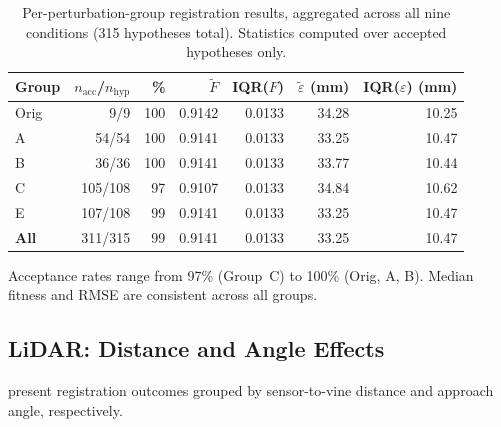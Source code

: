 \begin{table}[htbp]
  \centering
  \small
  \setlength{\tabcolsep}{4pt}
  \caption{Per-perturbation-group registration results, aggregated across all nine conditions (315 hypotheses total). Statistics computed over accepted hypotheses only.}
  \label{tab:pa-results-groups}
  \begin{tabular}{@{} l r r r r r r @{}}
    \toprule
    \textbf{Group} &
    \boldmath$n_\text{acc}$\textbf{/}\boldmath$n_\text{hyp}$ &
    \textbf{\%} &
    \boldmath$\tilde{F}$ &
    \textbf{IQR(}\boldmath$F$\textbf{)} &
    \boldmath$\tilde{\varepsilon}$ \textbf{(mm)} &
    \textbf{IQR(}\boldmath$\varepsilon$\textbf{) (mm)} \\
    \midrule
    Orig   &   9/9   & 100 & 0.9142 & 0.0133 & 34.28 & 10.25 \\
    A      &  54/54  & 100 & 0.9141 & 0.0133 & 33.25 & 10.47 \\
    B      &  36/36  & 100 & 0.9141 & 0.0133 & 33.77 & 10.44 \\
    C      & 105/108 &  97 & 0.9107 & 0.0133 & 34.84 & 10.62 \\
    E      & 107/108 &  99 & 0.9141 & 0.0133 & 33.25 & 10.47 \\
    \midrule
    \textbf{All} & 311/315 & 99 & 0.9141 & 0.0133 & 33.25 & 10.47 \\
    \bottomrule
  \end{tabular}
\end{table}

Acceptance rates range from 97\% (Group~C) to 100\% (Orig, A, B). Median fitness and RMSE are consistent across all groups.

\subsection{LiDAR: Distance and Angle Effects}
\label{subsec:pa-results-lidar-distance-angle}

 present registration outcomes grouped by sensor-to-vine distance and approach angle, respectively.

